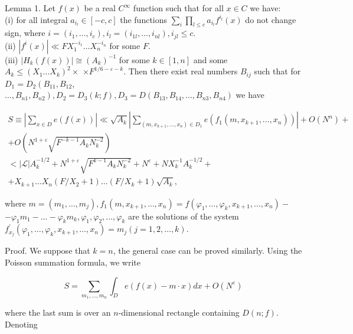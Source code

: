 \documentclass[10pt]{article}
\begin{document}
Lemma 1. Let $f(x)$ be a real $C^{\infty}$ function such that for all $x \in C$ we have:\\
(i) for all integral $a_{i_{l}} \in[-c, c]$ the functions $\sum_{i} \prod_{l \leqslant c} a_{i_{l}} f^{i_{l}}(x)$ do not change sign, where $i=\left(i_{1}, \ldots, i_{c}\right), i_{l}=\left(i_{1 l}, \ldots, i_{n l}\right), i_{j l} \leqslant c$.\\
(ii) $\left|f^{i}(x)\right| \ll F X_{1}^{-i_{1}} \ldots X_{n}^{-i_{n}}$ for some $F$.\\
(iii) $\left|H_{k}(f(x))\right| \cong\left(A_{k}\right)^{-1}$ for some $k \in[1, n]$ and some $A_{k} \leqslant\left(X_{1} \ldots X_{k}\right)^{2} \times$ $\times F^{1 / 6-\varepsilon-k}$. Then there exist real numbers $B_{i j}$ such that for $D_{1}=D_{2}\left(B_{11}, B_{12}\right.$, $\left.\ldots, B_{n 1}, B_{n 2}\right), D_{2}=D_{3}(k ; f), D_{3}=D\left(B_{13}, B_{14}, \ldots, B_{n 3}, B_{n 4}\right)$ we have

$$
\begin{array}{r}
S \equiv\left|\sum_{x \in D} e(f(x))\right| \ll \sqrt{A_{k}}\left|\sum_{\left(m, x_{k+1}, \ldots, x_{n}\right) \in D_{1}} e\left(f_{1}\left(m, x_{k+1}, \ldots, x_{n}\right)\right)\right|+O\left(N^{n}\right)+ \\
+O\left(N^{1+\varepsilon} \sqrt{F^{-k-1} A_{k} N_{k}^{-2}}\right) \\
<|\mathscr{L}| A_{k}^{-1 / 2}+N^{1+\varepsilon} \sqrt{F^{k-1} A_{k} N_{k}^{-2}}+N^{\varepsilon}+N X_{k}^{-1} A_{k}^{-1 / 2}+ \\
+X_{k+1} \ldots X_{n}\left(F / X_{2}+1\right) \ldots\left(F / X_{k}+1\right) \sqrt{A_{k}},
\end{array}
$$

where $m=\left(m_{1}, \ldots, m_{j}\right), f_{1}\left(m, x_{k+1}, \ldots, x_{n}\right)=f\left(\varphi_{1}, \ldots, \varphi_{k}, x_{k+1}, \ldots, x_{n}\right)-$ $-\varphi_{1} m_{1}-\ldots-\varphi_{k} m_{k}, \varphi_{1}, \varphi_{2}, \ldots, \varphi_{k}$ are the solutions of the system $f_{x_{j}}^{\prime}\left(\varphi_{1}, \ldots, \varphi_{k}, x_{k+1}, \ldots, x_{n}\right)=m_{j}(j=1,2, \ldots, k)$.

Proof. We suppose that $k=n$, the general case can be proved similarly. Using the Poisson summation formula, we write

$$
S=\sum_{m_{1}, \ldots, m_{n}} \int_{D} e(f(x)-m \cdot x) d x+O\left(N^{\varepsilon}\right)
$$

where the last sum is over an $n$-dimensional rectangle containing $D(n ; f)$. Denoting
\end{document}
